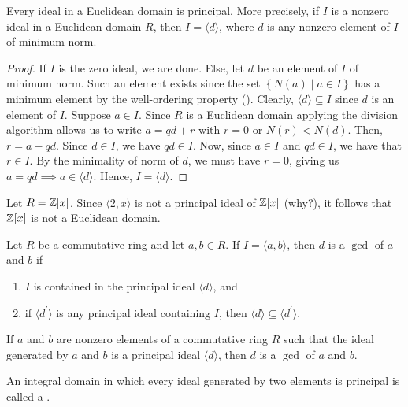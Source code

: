 \begin{prop}
    Every ideal in a Euclidean domain is principal. More precisely, if $I$ is a nonzero ideal in a Euclidean domain $R$, then $I = \langle d \rangle$, where $d$ is any nonzero element of $I$ of minimum norm.
\end{prop}
\begin{proof}
    If $I$ is the zero ideal, we are done. Else, let $d$ be an element of $I$ of minimum norm. Such an element exists since the set $\left\{ N(a) \mid a \in I \right\}$ has a minimum element by the well-ordering property (). Clearly, $\langle d \rangle \subseteq I$ since $d$ is an element of $I$. Suppose $a \in I$. Since $R$ is a Euclidean domain applying the division algorithm allows us to write $a = qd + r$ with $r = 0$ or $N(r) < N(d)$. Then, $r = a - qd$. Since $d \in I$, we have $qd \in I$. Now, since $a \in I$ and $qd \in I$, we have that $r \in I$. By the minimality of norm of $d$, we must have $r = 0$, giving us $a = qd \implies a \in \langle d \rangle$. Hence, $I = \langle d \rangle$.
\end{proof}

\begin{ex} \label{ex:Z[x]-not-principal ideal domain}
    Let $R = \mathbb{Z}[x]$. Since $\langle 2,x \rangle$ is not a principal ideal of $\mathbb{Z}[x]$ (why?), it follows that $\mathbb{Z}[x]$ is not a Euclidean domain.
\end{ex}

\begin{prop}
    Let $R$ be a commutative ring and let $a,b \in R$. If $I = \langle a,b \rangle$, then $d$ is a $\gcd$ of $a$ and $b$ if
    \begin{enumerate}
        \item $I$ is contained in the principal ideal $\langle d \rangle$, and
        \item if $\langle d^{\prime} \rangle$ is any principal ideal containing $I$, then $\langle d\rangle \subseteq \langle d^{\prime}  \rangle$. 
    \end{enumerate}
\end{prop}
\begin{prop}
    If $a$ and $b$ are nonzero elements of a commutative ring $R$ such that the ideal generated by $a$ and $b$ is a principal ideal $\langle d \rangle$, then $d$ is a $\gcd$ of $a$ and $b$.
\end{prop}

\begin{defn}
    An integral domain in which every ideal generated by two elements is principal is called a .
\end{defn}

